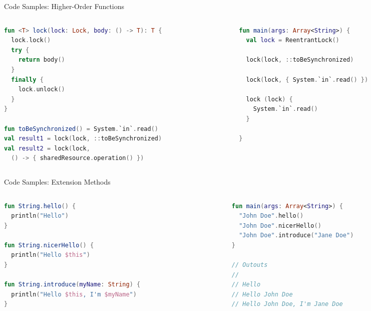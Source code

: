 \begin{frame}[fragile]{Code Samples: Higher-Order Functions}
	\begin{columns}
		\begin{column}{0.5\textwidth}
\begin{lstlisting}[language=Kotlin,basicstyle=\ttfamily\tiny]
fun <T> lock(lock: Lock, body: () -> T): T {
  lock.lock()
  try {
    return body()
  }
  finally {
    lock.unlock()
  }
}

fun toBeSynchronized() = System.`in`.read()
val result1 = lock(lock, ::toBeSynchronized)
val result2 = lock(lock,
  () -> { sharedResource.operation() })
\end{lstlisting}
		\end{column}
		\begin{column}{0.5\textwidth}
\begin{lstlisting}[language=Kotlin,basicstyle=\ttfamily\tiny]
fun main(args: Array<String>) {
  val lock = ReentrantLock()

  lock(lock, ::toBeSynchronized)

  lock(lock, { System.`in`.read() })

  lock (lock) {
    System.`in`.read()
  }

}
\end{lstlisting}
		\end{column}
	\end{columns}
\end{frame}

\begin{frame}[fragile]{Code Samples: Extension Methods}
	\begin{columns}
		\begin{column}{0.5\textwidth}
\begin{lstlisting}[language=Kotlin,basicstyle=\ttfamily\tiny]
fun String.hello() {
  println("Hello")
}

fun String.nicerHello() {
  println("Hello $this")
}

fun String.introduce(myName: String) {
  println("Hello $this, I'm $myName")
}
\end{lstlisting}
		\end{column}
		\begin{column}{0.5\textwidth}
\begin{lstlisting}[language=Kotlin,basicstyle=\ttfamily\tiny]
fun main(args: Array<String>) {
  "John Doe".hello()
  "John Doe".nicerHello()
  "John Doe".introduce("Jane Doe")
}

// Outouts
//
// Hello
// Hello John Doe
// Hello John Doe, I'm Jane Doe
\end{lstlisting}
		\end{column}
	\end{columns}
\end{frame}

